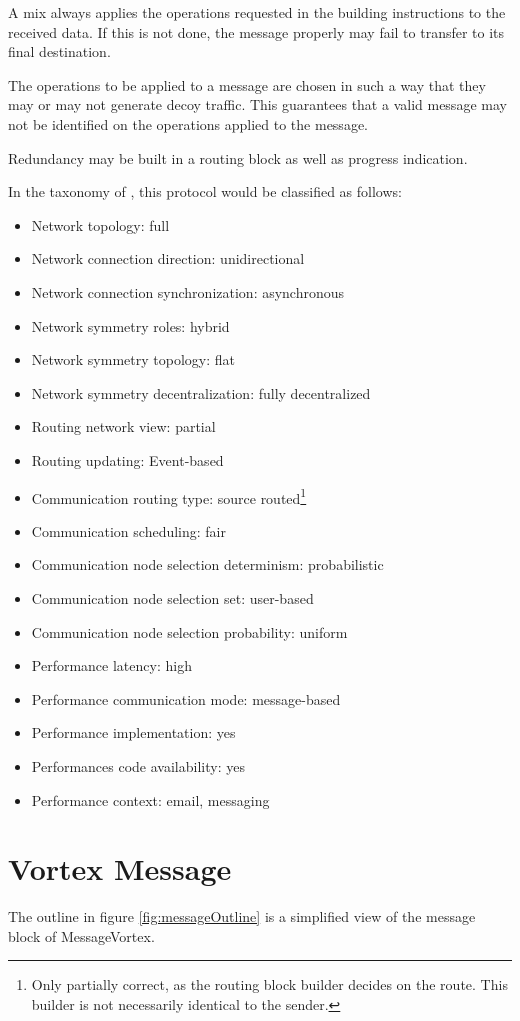 A mix always applies the operations requested in the building instructions to the received data. If this is not done, the message properly may fail to transfer to its final destination. 

The operations to be applied to a message are chosen in such a way that they may or may not generate decoy traffic. This guarantees that a valid message may not be identified on the operations applied to the message.

Redundancy may be built in a routing block as well as progress indication.

In the taxonomy of \cite{Shirazi2018}, this protocol would be classified as follows:

\begin{itemize}
	\item Network topology: full
	\item Network connection direction: unidirectional
	\item Network connection synchronization: asynchronous
	\item Network symmetry roles: hybrid
	\item Network symmetry topology: flat
	\item Network symmetry decentralization: fully decentralized
	\item Routing network view: partial
	\item Routing updating: Event-based
	\item Communication routing type: source routed\footnote{Only partially correct, as the routing block builder decides on the route. This builder is not necessarily identical to the sender.}
	\item Communication scheduling: fair
	\item Communication node selection determinism: probabilistic
	\item Communication node selection set: user-based
	\item Communication node selection probability: uniform
	\item Performance latency: high
	\item Performance communication mode: message-based
	\item Performance implementation: yes
	\item Performances code availability: yes
	\item Performance context: email, messaging
\end{itemize}

\section{Vortex Message}
The outline in figure \ref{fig:messageOutline} is a simplified view of the message block of MessageVortex.

